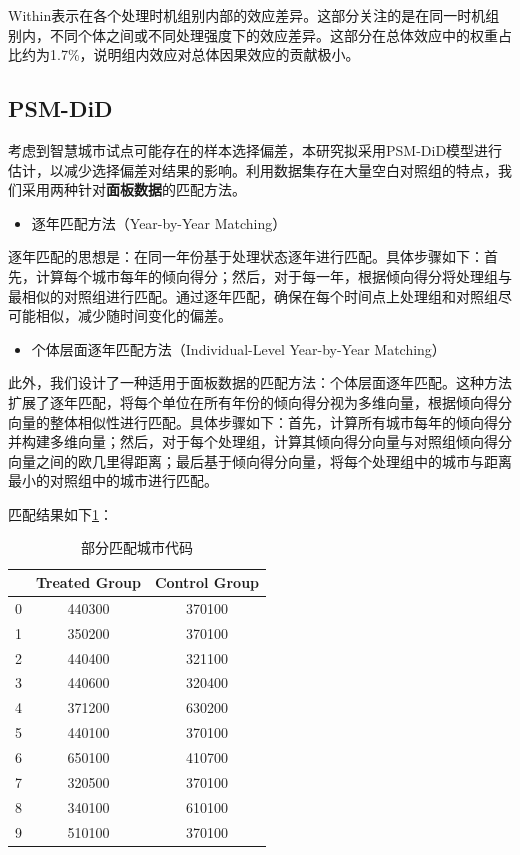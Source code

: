 \documentclass[a4paper,12pt]{article}
\begin{document}
Within表示在各个处理时机组别内部的效应差异。这部分关注的是在同一时机组别内，不同个体之间或不同处理强度下的效应差异。这部分在总体效应中的权重占比约为1.7\%，说明组内效应对总体因果效应的贡献极小。



\subsection{PSM-DiD}

考虑到智慧城市试点可能存在的样本选择偏差，本研究拟采用PSM-DiD模型进行估计，以减少选择偏差对结果的影响。利用数据集存在大量空白对照组的特点，我们采用两种针对\textbf{面板数据}的匹配方法。

\begin{itemize}
    \item 逐年匹配方法（Year-by-Year Matching）
\end{itemize}

逐年匹配的思想是：在同一年份基于处理状态逐年进行匹配。具体步骤如下：首先，计算每个城市每年的倾向得分；然后，对于每一年，根据倾向得分将处理组与最相似的对照组进行匹配。通过逐年匹配，确保在每个时间点上处理组和对照组尽可能相似，减少随时间变化的偏差。

\begin{itemize}
    \item 个体层面逐年匹配方法（Individual-Level Year-by-Year Matching）
\end{itemize}

此外，我们设计了一种适用于面板数据的匹配方法：个体层面逐年匹配。这种方法扩展了逐年匹配，将每个单位在所有年份的倾向得分视为多维向量，根据倾向得分向量的整体相似性进行匹配。具体步骤如下：首先，计算所有城市每年的倾向得分并构建多维向量；然后，对于每个处理组，计算其倾向得分向量与对照组倾向得分向量之间的欧几里得距离；最后基于倾向得分向量，将每个处理组中的城市与距离最小的对照组中的城市进行匹配。

匹配结果如下\ref{tab:code}：

\begin{table}[H]
    \centering
    \begin{tabular}{ccc}
\toprule
& \textbf{Treated Group} & \textbf{Control Group}\\
\midrule
0 & 440300 & 370100 \\
1 & 350200 & 370100 \\
2 & 440400 & 321100 \\
3 & 440600 & 320400 \\
4 & 371200 & 630200 \\
5 & 440100 & 370100 \\
6 & 650100 & 410700 \\
7 & 320500 & 370100 \\
8 & 340100 & 610100 \\
9 & 510100 & 370100 \\
\bottomrule
\end{tabular}
    \caption{部分匹配城市代码}
    \label{tab:code}
\end{table}
\end{document}
